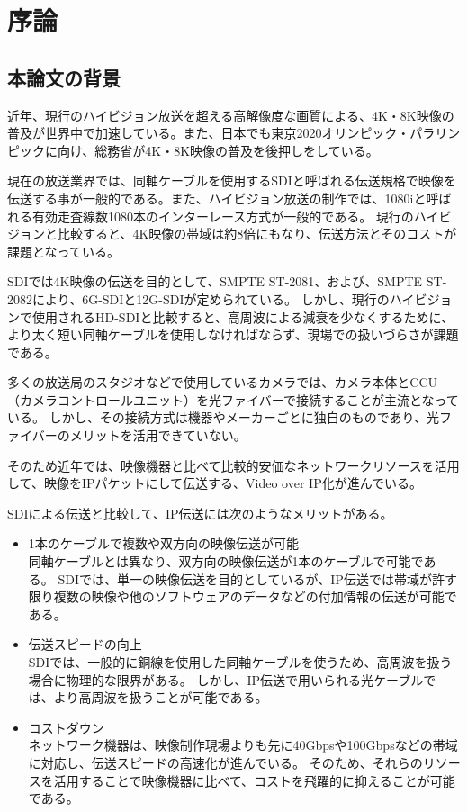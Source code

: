 \chapter{序論}
\label{chap:introduction}

\section{本論文の背景}
近年、現行のハイビジョン放送を超える高解像度な画質による、4K・8K映像の普及が世界中で加速している。また、日本でも東京2020オリンピック・パラリンピックに向け、総務省が4K・8K映像の普及を後押しをしている。

現在の放送業界では、同軸ケーブルを使用するSDIと呼ばれる伝送規格で映像を伝送する事が一般的である。また、ハイビジョン放送の制作では、1080iと呼ばれる有効走査線数1080本のインターレース方式が一般的である。
現行のハイビジョンと比較すると、4K映像の帯域は約8倍にもなり、伝送方法とそのコストが課題となっている。

SDIでは4K映像の伝送を目的として、SMPTE ST-2081\cite{smpte-st-2081}、および、SMPTE ST-2082\cite{smpte-st-2082}により、6G-SDIと12G-SDIが定められている。
しかし、現行のハイビジョンで使用されるHD-SDIと比較すると、高周波による減衰を少なくするために、より太く短い同軸ケーブルを使用しなければならず、現場での扱いづらさが課題である。

多くの放送局のスタジオなどで使用しているカメラでは、カメラ本体とCCU（カメラコントロールユニット）を光ファイバーで接続することが主流となっている。
しかし、その接続方式は機器やメーカーごとに独自のものであり、光ファイバーのメリットを活用できていない。

そのため近年では、映像機器と比べて比較的安価なネットワークリソースを活用して、映像をIPパケットにして伝送する、Video over IP化が進んでいる。

SDIによる伝送と比較して、IP伝送には次のようなメリットがある\cite{kodera-interbee2015}。
\begin{itemize}
  \item 1本のケーブルで複数や双方向の映像伝送が可能\mbox{}\\
    同軸ケーブルとは異なり、双方向の映像伝送が1本のケーブルで可能である。
    SDIでは、単一の映像伝送を目的としているが、IP伝送では帯域が許す限り複数の映像や他のソフトウェアのデータなどの付加情報の伝送が可能である。
  \item 伝送スピードの向上\mbox{}\\
    SDIでは、一般的に銅線を使用した同軸ケーブルを使うため、高周波を扱う場合に物理的な限界がある。
    しかし、IP伝送で用いられる光ケーブルでは、より高周波を扱うことが可能である。
  \item コストダウン\mbox{}\\
    ネットワーク機器は、映像制作現場よりも先に40Gbpsや100Gbpsなどの帯域に対応し、伝送スピードの高速化が進んでいる。
    そのため、それらのリソースを活用することで映像機器に比べて、コストを飛躍的に抑えることが可能である。
\end{itemize}


